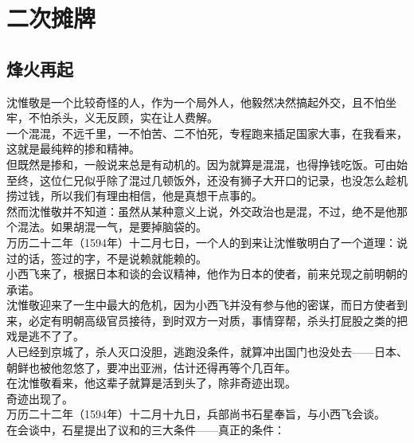 \section{二次摊牌}
\ifnum{}
	\begin{multicols}{\theparacolNo}
\fi
\subsection{烽火再起}
沈惟敬是一个比较奇怪的人，作为一个局外人，他毅然决然搞起外交，且不怕坐牢，不怕杀头，义无反顾，实在让人费解。\\

一个混混，不远千里，一不怕苦、二不怕死，专程跑来插足国家大事，在我看来，这就是最纯粹的掺和精神。\\

但既然是掺和，一般说来总是有动机的。因为就算是混混，也得挣钱吃饭。可由始至终，这位仁兄似乎除了混过几顿饭外，还没有狮子大开口的记录，也没怎么趁机捞过钱，所以我们有理由相信，他是真想干点事的。\\

然而沈惟敬并不知道：虽然从某种意义上说，外交政治也是混，不过，绝不是他那个混法。如果胡混一气，是要掉脑袋的。\\

万历二十二年（1594年）十二月七日，一个人的到来让沈惟敬明白了一个道理：说过的话，签过的字，不是说赖就能赖的。\\

小西飞来了，根据日本和谈的会议精神，他作为日本的使者，前来兑现之前明朝的承诺。\\

沈惟敬迎来了一生中最大的危机，因为小西飞并没有参与他的密谋，而日方使者到来，必定有明朝高级官员接待，到时双方一对质，事情穿帮，杀头打屁股之类的把戏是逃不了了。\\

人已经到京城了，杀人灭口没胆，逃跑没条件，就算冲出国门也没处去——日本、朝鲜也被他忽悠了，要冲出亚洲，估计还得再等个几百年。\\

在沈惟敬看来，他这辈子就算是活到头了，除非奇迹出现。\\

奇迹出现了。\\

万历二十二年（1594年）十二月十九日，兵部尚书石星奉旨，与小西飞会谈。\\

在会谈中，石星提出了议和的三大条件——真正的条件：\\


\end{multicols}
